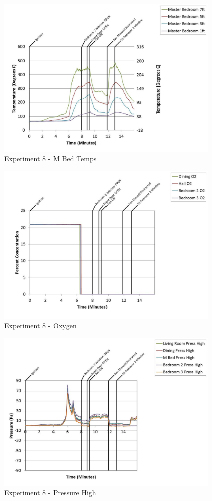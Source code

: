 \documentclass{article}
\begin{document}
\begin{appendices}
	\clearpage

	\begin{figure}[h!]
		\centering
		\includegraphics[height=3.05in]{0_Images/Results_Charts/Exp_8_Charts/MBedTemps.pdf}
		\caption{Experiment 8 - M Bed Temps}
	\end{figure}
 

	\begin{figure}[h!]
		\centering
		\includegraphics[height=3.05in]{0_Images/Results_Charts/Exp_8_Charts/Oxygen.pdf}
		\caption{Experiment 8 - Oxygen}
	\end{figure}
 
	\clearpage

	\begin{figure}[h!]
		\centering
		\includegraphics[height=3.05in]{0_Images/Results_Charts/Exp_8_Charts/PressureHigh.pdf}
		\caption{Experiment 8 - Pressure High}
	\end{figure}
 


\end{appendices}
\end{document}
